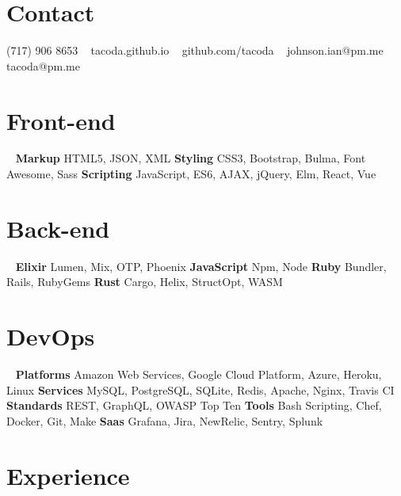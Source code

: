 \documentclass[]{cv-style}          %
\begin{document}


\begin{aside}
%
\section{Contact}
(717) 906 8653
~
tacoda.github.io
~
github.com/tacoda
~
johnson.ian@pm.me
tacoda@pm.me
%
\section{Front-end}
~
\textbf{Markup}
HTML5, JSON, XML
\textbf{Styling}
CSS3, Bootstrap, Bulma, Font Awesome, Sass
\textbf{Scripting}
JavaScript, ES6, AJAX, jQuery, Elm, React, Vue
\section{Back-end}
~
\textbf{Elixir}
Lumen, Mix, OTP, Phoenix
\textbf{JavaScript}
Npm, Node
\textbf{Ruby}
Bundler, Rails, RubyGems
\textbf{Rust}
Cargo, Helix, StructOpt, WASM
\section{DevOps}
~
\textbf{Platforms}
Amazon Web Services, Google Cloud Platform, Azure, Heroku, Linux
\textbf{Services}
MySQL, PostgreSQL, SQLite, Redis, Apache, Nginx, Travis CI
\textbf{Standards}
REST, GraphQL, OWASP Top Ten
\textbf{Tools}
Bash Scripting, Chef, Docker, Git, Make
\textbf{Saas}
Grafana, Jira, NewRelic, Sentry, Splunk
\end{aside}


\section{Experience}
\end{document}
